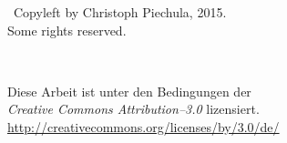 \newpage 
\thispagestyle{empty}
\vspace*{0in}
\begin{center}
    {\Large{}}\ Copyleft by Christoph Piechula, 2015. \\
    Some rights reserved. \\
    \vspace{1in}
    \begin{minipage}[c]{0.2\linewidth}
        \hfill {\Huge \ccLogo~\ccAttribution}
    \end{minipage}
    \hspace{0.1cm}
    \begin{minipage}[c]{0.7\linewidth}
        Diese Arbeit ist unter den Bedingungen der \\
        \textit{Creative Commons Attribution--3.0} lizensiert. \\
        \url{http://creativecommons.org/licenses/by/3.0/de/}
    \end{minipage}
\end{center}
\clearpage
{}
\setcounter{page}{0}
